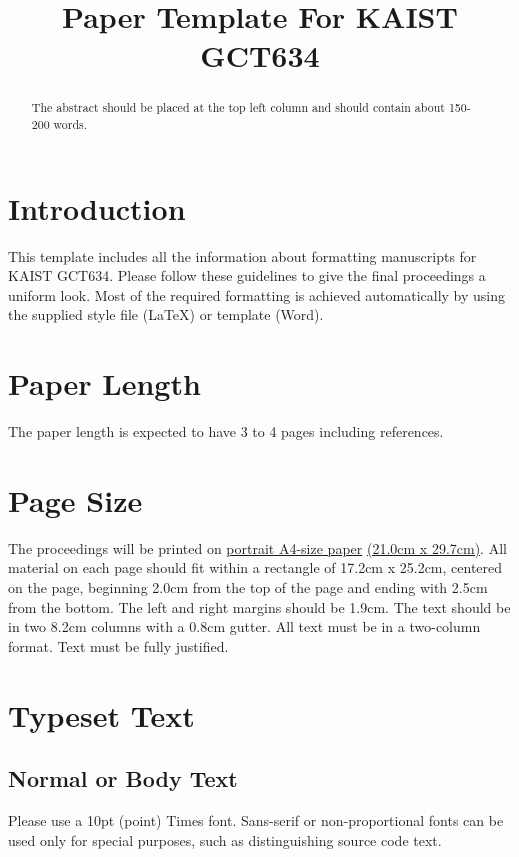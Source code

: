 \documentclass{article}
\title{Paper Template For KAIST GCT634}
\begin{document}
%
\maketitle
%
\begin{abstract}
The abstract should be placed at the top left column and should contain about 150-200 words.
\end{abstract}
%
\section{Introduction}\label{sec:introduction}

This template includes all the information about formatting manuscripts for KAIST GCT634.
Please follow these guidelines to give the final proceedings a uniform look.
Most of the required formatting is achieved automatically by using the supplied
style file (\LaTeX) or template (Word).

%
\section{Paper Length}
The paper length is expected to have 3 to 4 pages including references. 

\section{Page Size}\label{sec:page_size}

The proceedings will be printed on
 \underline{portrait A4-size paper} \underline{(21.0cm x 29.7cm)}.
All material on each page should fit within a rectangle of 17.2cm x 25.2cm,
centered on the page, beginning 2.0cm
from the top of the page and ending with 2.5cm from the bottom.
The left and right margins should be 1.9cm.
The text should be in two 8.2cm columns with a 0.8cm gutter.
All text must be in a two-column format.
Text must be fully justified.

\section{Typeset Text}\label{sec:typeset_text}

\subsection{Normal or Body Text}\label{subsec:body}

Please use a 10pt (point) Times font. Sans-serif or non-proportional fonts
can be used only for special purposes, such as distinguishing source code text.
\end{document}

